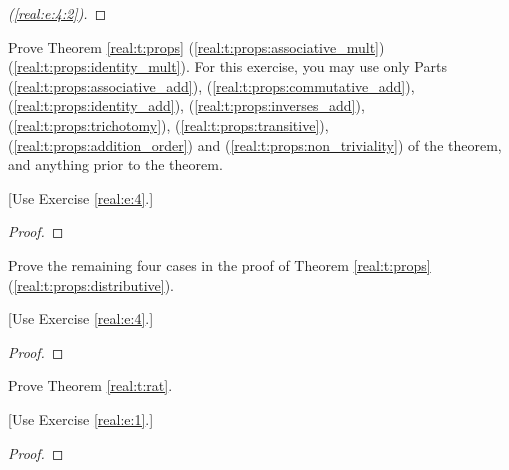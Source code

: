 \begin{proof}[(\ref{real:e:4:2})]
	\TBD
\end{proof}





\Newpage
\begin{exercise} %
	\label{real:e:5}
	Prove Theorem \ref{real:t:props} (\ref{real:t:props:associative_mult}) (\ref{real:t:props:identity_mult}). For this exercise, you may use only Parts (\ref{real:t:props:associative_add}), (\ref{real:t:props:commutative_add}), (\ref{real:t:props:identity_add}), (\ref{real:t:props:inverses_add}), (\ref{real:t:props:trichotomy}), (\ref{real:t:props:transitive}), (\ref{real:t:props:addition_order}) and (\ref{real:t:props:non_triviality}) of the theorem, and anything prior to the theorem.

	\hfill [Use Exercise \ref{real:e:4}.]
\end{exercise}

\begin{proof}
	\TBD

\end{proof}


\Newpage
\begin{exercise} %
	\label{real:e:6}
	Prove the remaining four cases in the proof of Theorem \ref{real:t:props} (\ref{real:t:props:distributive}).

	\hfill [Use Exercise \ref{real:e:4}.]
\end{exercise}

\begin{proof}
	\TBD
\end{proof}


\Newpage
\begin{exercise} %
	\label{real:e:7}
	Prove Theorem \ref{real:t:rat}.

	\hfill [Use Exercise \ref{real:e:1}.]
\end{exercise}

\begin{proof}
	\TBD
\end{proof}